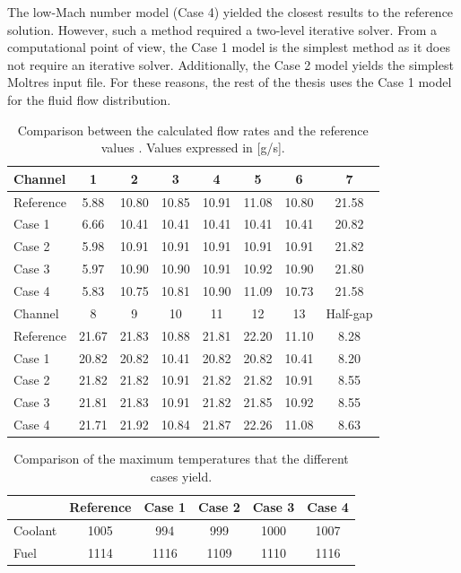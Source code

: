The low-Mach number model (Case 4) yielded the closest results to the reference solution.
However, such a method required a two-level iterative solver.
From a computational point of view, the Case 1 model is the simplest method as it does not require an iterative solver.
Additionally, the Case 2 model yields the simplest Moltres input file.
For these reasons, the rest of the thesis uses the Case 1 model for the fluid flow distribution.

\begin{table}[htbp!]
  \centering
  \caption{Comparison between the calculated flow rates and the reference values \cite{sato_computational_2010}. Values expressed in [g/s].}
  \label{tab:th-assem-flow-massflow}
  \begin{tabular}{l|ccccccc}
\toprule
Channel & 1 & 2 & 3 & 4 & 5 & 6 & 7 \\
\midrule
Reference  & 5.88 & 10.80 & 10.85 & 10.91 & 11.08 & 10.80 & 21.58 \\
Case 1  & 6.66 & 10.41 & 10.41 & 10.41 & 10.41 & 10.41 & 20.82 \\
Case 2  & 5.98 & 10.91 & 10.91 & 10.91 & 10.91 & 10.91 & 21.82 \\
Case 3  & 5.97 & 10.90 & 10.90 & 10.91 & 10.92 & 10.90 & 21.80 \\
Case 4  & 5.83 & 10.75 & 10.81 & 10.90 & 11.09 & 10.73 & 21.58 \\
\midrule
Channel & 8 & 9 & 10 & 11 & 12 & 13 & Half-gap \\
\midrule
Reference  & 21.67 & 21.83 & 10.88 & 21.81 & 22.20 & 11.10 & 8.28 \\
Case 1  & 20.82 & 20.82 & 10.41 & 20.82 & 20.82 & 10.41 & 8.20 \\
Case 2  & 21.82 & 21.82 & 10.91 & 21.82 & 21.82 & 10.91 & 8.55 \\
Case 3  & 21.81 & 21.83 & 10.91 & 21.82 & 21.85 & 10.92 & 8.55 \\
Case 4  & 21.71 & 21.92 & 10.84 & 21.87 & 22.26 & 11.08 & 8.63 \\
\bottomrule
\end{tabular}
\end{table}

\begin{table}[htbp!]
  \centering
  \caption{Comparison of the maximum temperatures that the different cases yield.}
  \label{tab:th-assem-flow-results}
\begin{tabular}{l|ccccc}
\toprule
        & Reference & Case 1 & Case 2 & Case 3 & Case 4 \\
\midrule
Coolant & 1005    &  994   &  999   & 1000  & 1007 \\
Fuel    & 1114    & 1116   & 1109   & 1110  & 1116 \\
\bottomrule
\end{tabular}
\end{table}


